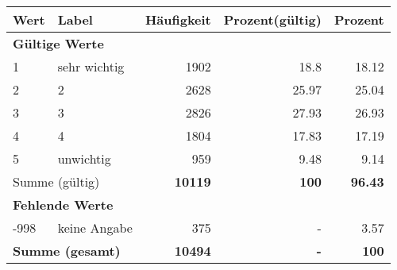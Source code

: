      \begin{longtable}{lXrrr}
     \toprule
     \textbf{Wert} & \textbf{Label} & \textbf{Häufigkeit} & \textbf{Prozent(gültig)} & \textbf{Prozent} \\
     \endhead
     \midrule
     \multicolumn{5}{l}{\textbf{Gültige Werte}}\\

     1 &
     \multicolumn{1}{X}{ sehr wichtig   } &


       \num{1902} &
       \num[round-mode=places,round-precision=2]{18,8} &
         \num[round-mode=places,round-precision=2]{18,12} \\

     2 &
     \multicolumn{1}{X}{ 2   } &


       \num{2628} &
       \num[round-mode=places,round-precision=2]{25,97} &
         \num[round-mode=places,round-precision=2]{25,04} \\

     3 &
     \multicolumn{1}{X}{ 3   } &


       \num{2826} &
       \num[round-mode=places,round-precision=2]{27,93} &
         \num[round-mode=places,round-precision=2]{26,93} \\

     4 &
     \multicolumn{1}{X}{ 4   } &


       \num{1804} &
       \num[round-mode=places,round-precision=2]{17,83} &
         \num[round-mode=places,round-precision=2]{17,19} \\

     5 &
     \multicolumn{1}{X}{ unwichtig   } &


       \num{959} &
       \num[round-mode=places,round-precision=2]{9,48} &
         \num[round-mode=places,round-precision=2]{9,14} \\
     \midrule
     \multicolumn{2}{l}{Summe (gültig)} &
       \textbf{\num{10119}} &
     \textbf{100} &
       \textbf{\num[round-mode=places,round-precision=2]{96,43}} \\
     \multicolumn{5}{l}{\textbf{Fehlende Werte}}\\
       -998 &
       keine Angabe &
         \num{375} &
        - &
         \num[round-mode=places,round-precision=2]{3,57} \\
     \midrule
     \multicolumn{2}{l}{\textbf{Summe (gesamt)}} &
          \textbf{\num{10494}} &
        \textbf{-} &
        \textbf{100} \\
     \bottomrule
     \end{longtable}
     
